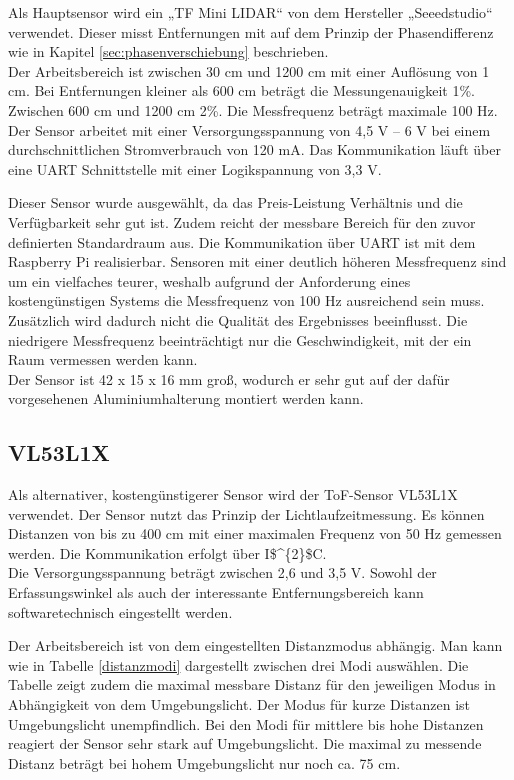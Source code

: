 Als Hauptsensor wird ein „TF Mini \ac{LIDAR}“ von dem Hersteller „Seeedstudio“ verwendet. Dieser misst Entfernungen mit auf dem Prinzip der Phasendifferenz wie in Kapitel \ref{sec:phasenverschiebung} beschrieben.\\
Der Arbeitsbereich ist zwischen 30 cm und 1200 cm mit einer Auflösung von 1 cm. Bei Entfernungen kleiner als 600 cm beträgt die Messungenauigkeit 1\%. Zwischen 600 cm und 1200 cm 2\%. Die Messfrequenz beträgt maximale 100 Hz.\\
Der Sensor arbeitet mit einer Versorgungsspannung von 4,5 V – 6 V bei einem durchschnittlichen Stromverbrauch von 120 mA. Das Kommunikation läuft über eine \ac{UART} Schnittstelle mit einer Logikspannung von 3,3 V. \cite{TFMINI}

Dieser Sensor wurde ausgewählt, da das Preis-Leistung Verhältnis und die Verfügbarkeit sehr gut ist. Zudem reicht der messbare Bereich für den zuvor definierten Standardraum aus. Die Kommunikation über \ac{UART} ist mit dem Raspberry Pi realisierbar. Sensoren mit einer deutlich höheren Messfrequenz sind um ein vielfaches teurer, weshalb aufgrund der Anforderung eines kostengünstigen Systems die Messfrequenz von 100 Hz  ausreichend sein muss. Zusätzlich wird dadurch nicht die Qualität des Ergebnisses beeinflusst. Die niedrigere Messfrequenz beeinträchtigt nur die Geschwindigkeit, mit der ein Raum vermessen werden kann. \\
Der Sensor ist 42 x 15 x 16 mm groß, wodurch er sehr gut auf der dafür vorgesehenen Aluminiumhalterung montiert werden kann. 


\subsection{VL53L1X} \label{sec:VL53L1X}

Als alternativer, kostengünstigerer Sensor wird der \ac{ToF}-Sensor VL53L1X verwendet. Der Sensor nutzt das Prinzip der Lichtlaufzeitmessung. Es können Distanzen von bis zu 400 cm mit einer maximalen Frequenz von 50 Hz gemessen werden. Die Kommunikation erfolgt über \ac{I$^{2}$C}. \\
Die Versorgungsspannung beträgt zwischen 2,6 und 3,5 V. Sowohl der Erfassungswinkel als auch der interessante Entfernungsbereich kann softwaretechnisch eingestellt werden. \cite{VL53L1X}

Der Arbeitsbereich ist von dem eingestellten Distanzmodus abhängig. Man kann wie in Tabelle \ref{distanzmodi} dargestellt zwischen drei Modi auswählen. Die Tabelle zeigt zudem die maximal messbare Distanz für den jeweiligen Modus in Abhängigkeit von dem Umgebungslicht. Der Modus für kurze Distanzen ist  Umgebungslicht unempfindlich. Bei den Modi für mittlere bis hohe Distanzen reagiert der Sensor sehr stark auf Umgebungslicht. Die maximal zu messende Distanz beträgt bei hohem Umgebungslicht nur noch ca. 75 cm. 

